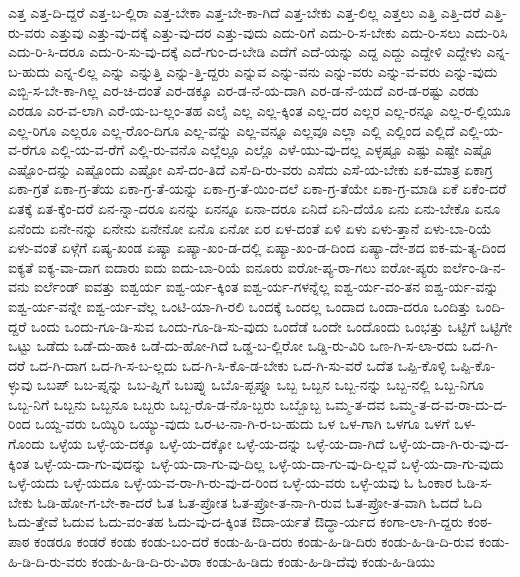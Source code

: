 {ಎತ್ತ
ಎತ್ತ-ದಿ-ದ್ದರೆ
ಎತ್ತ-ಬ-ಲ್ಲಿರಾ
ಎತ್ತ-ಬೇಕಾ
ಎತ್ತ-ಬೇ-ಕಾ-ಗಿದೆ
ಎತ್ತ-ಬೇಕು
ಎತ್ತ-ಲಿಲ್ಲ
ಎತ್ತಲು
ಎತ್ತಿ
ಎತ್ತಿ-ದರೆ
ಎತ್ತಿ-ರು-ವರು
ಎತ್ತುವು
ಎತ್ತು-ವು-ದಕ್ಕೆ
ಎತ್ತು-ವು-ದರ
ಎತ್ತು-ವುದು
ಎದು-ರಿಗೆ
ಎದು-ರಿ-ಸ-ಬೇಕು
ಎದು-ರಿ-ಸಲು
ಎದು-ರಿಸಿ
ಎದು-ರಿ-ಸಿ-ದರೂ
ಎದು-ರಿ-ಸು-ವು-ದಕ್ಕೆ
ಎದೆ-ಗುಂ-ದ-ಬೇಡಿ
ಎದೆಗೆ
ಎದೆ-ಯನ್ನು
ಎದ್ದ
ಎದ್ದು
ಎದ್ದೇಳಿ
ಎದ್ದೇಳು
ಎನ್ನ-ಬ-ಹುದು
ಎನ್ನ-ಲಿಲ್ಲ
ಎನ್ನು
ಎನ್ನುತ್ತಿ
ಎನ್ನು-ತ್ತಿ-ದ್ದರು
ಎನ್ನುವ
ಎನ್ನು-ವನು
ಎನ್ನು-ವರು
ಎನ್ನು-ವ-ವರು
ಎನ್ನು-ವುದು
ಎಬ್ಬಿ-ಸ-ಬೇ-ಕಾ-ಗಿಲ್ಲ
ಎರ-ಚಿ-ದಂತೆ
ಎರ-ಡಕ್ಕೂ
ಎರ-ಡ-ನೆ-ಯ-ದಾಗಿ
ಎರ-ಡ-ನೆ-ಯದೆ
ಎರ-ಡ-ರಷ್ಟು
ಎರಡು
ಎರಡೂ
ಎರ-ವ-ಲಾಗಿ
ಎರೆ-ಯ-ಬ-ಲ್ಲಂ-ತಹ
ಎಲೈ
ಎಲ್ಲ
ಎಲ್ಲ-ಕ್ಕಿಂತ
ಎಲ್ಲ-ದರ
ಎಲ್ಲರ
ಎಲ್ಲ-ರನ್ನೂ
ಎಲ್ಲ-ರ-ಲ್ಲಿಯೂ
ಎಲ್ಲ-ರಿಗೂ
ಎಲ್ಲರೂ
ಎಲ್ಲ-ರೊಂ-ದಿಗೂ
ಎಲ್ಲ-ವನ್ನು
ಎಲ್ಲ-ವನ್ನೂ
ಎಲ್ಲವೂ
ಎಲ್ಲಾ
ಎಲ್ಲಿ
ಎಲ್ಲಿಂದ
ಎಲ್ಲಿದೆ
ಎಲ್ಲಿ-ಯ-ವ-ರೆಗೂ
ಎಲ್ಲಿ-ಯ-ವ-ರೆಗೆ
ಎಲ್ಲಿ-ರು-ವನೊ
ಎಲ್ಲೆಲ್ಲೂ
ಎಲ್ಲೊ
ಎಳೆ-ಯು-ವು-ದಲ್ಲ
ಎಳ್ಳಷ್ಟೂ
ಎಷ್ಟು
ಎಷ್ಟೇ
ಎಷ್ಟೊ
ಎಷ್ಟೊಂ-ದನ್ನು
ಎಷ್ಟೊಂದು
ಎಷ್ಟೋ
ಎಸೆ-ದಂ-ತಿದೆ
ಎಸೆ-ದಿ-ರು-ವರು
ಎಸೆದು
ಎಸೆ-ಯ-ಬೇಕು
ಏಕ-ಮಾತ್ರ
ಏಕಾಗ್ರ
ಏಕಾ-ಗ್ರತೆ
ಏಕಾ-ಗ್ರ-ತೆಯ
ಏಕಾ-ಗ್ರ-ತೆ-ಯನ್ನು
ಏಕಾ-ಗ್ರ-ತೆ-ಯಿಂ-ದಲೆ
ಏಕಾ-ಗ್ರ-ತೆಯೇ
ಏಕಾ-ಗ್ರ-ಮಾಡಿ
ಏಕೆ
ಏಕೆಂ-ದರೆ
ಏತಕ್ಕೆ
ಏತ-ಕ್ಕೆಂ-ದರೆ
ಏನ-ನ್ನಾ-ದರೂ
ಏನನ್ನು
ಏನನ್ನೂ
ಏನಾ-ದರೂ
ಏನಿದೆ
ಏನಿ-ದೆಯೊ
ಏನು
ಏನು-ಬೇಕೊ
ಏನೂ
ಏನೆಂದು
ಏನೇ-ನನ್ನು
ಏನೇನು
ಏನೇನೋ
ಏನೊ
ಏನೋ
ಏರ
ಏಳ-ದಂತೆ
ಏಳಿ
ಏಳು
ಏಳು-ತ್ತಾನೆ
ಏಳು-ಬಾ-ರಿಯೆ
ಏಳು-ವಂತೆ
ಏಳ್ಗೆಗೆ
ಏಷ್ಯ-ಖಂಡ
ಏಷ್ಯಾ
ಏಷ್ಯಾ-ಖಂ-ಡ-ದಲ್ಲಿ
ಏಷ್ಯಾ-ಖಂ-ಡ-ದಿಂದ
ಏಷ್ಯಾ-ದೇ-ಶದ
ಐಕ-ಮ-ತ್ಯ-ದಿಂದ
ಐಕ್ಯತೆ
ಐಕ್ಯ-ವಾ-ದಾಗ
ಐದಾರು
ಐದು
ಐದು-ಬಾ-ರಿಯೆ
ಐನೂರು
ಐರೋ-ಪ್ಯ-ರಾ-ಗಲು
ಐರೋ-ಪ್ಯರು
ಐರ್ಲೆಂ-ಡಿ-ನ-ವನು
ಐರ್ಲೆಂಡ್
ಐವತ್ತು
ಐಶ್ವರ್ಯ
ಐಶ್ವ-ರ್ಯ-ಕ್ಕಿಂತ
ಐಶ್ವ-ರ್ಯ-ಗಳನ್ನೆಲ್ಲ
ಐಶ್ವ-ರ್ಯ-ವಂ-ತನ
ಐಶ್ವ-ರ್ಯ-ವನ್ನು
ಐಶ್ವ-ರ್ಯ-ವನ್ನೇ
ಐಶ್ವ-ರ್ಯ-ವೆಲ್ಲ
ಒಂಟಿ-ಯಾ-ಗಿ-ರಲಿ
ಒಂದಕ್ಕೆ
ಒಂದಲ್ಲ
ಒಂದಾದ
ಒಂದಾ-ದರೂ
ಒಂದಿತ್ತು
ಒಂದಿ-ದ್ದರೆ
ಒಂದು
ಒಂದು-ಗೂ-ಡಿ-ಸುವ
ಒಂದು-ಗೂ-ಡಿ-ಸು-ವುದು
ಒಂದೆಡೆ
ಒಂದೇ
ಒಂದೊಂದು
ಒಂಭತ್ತು
ಒಟ್ಟಿಗೆ
ಒಟ್ಟಿಗೇ
ಒಟ್ಟು
ಒಡೆದು
ಒಡೆ-ದು-ಹಾಕಿ
ಒಡೆ-ದು-ಹೋ-ಗಿದೆ
ಒಡ್ಡ-ಬ-ಲ್ಲಿರೋ
ಒಡ್ಡಿ-ರು-ವಿರಿ
ಒಣ-ಗಿ-ಸ-ಲಾ-ರದು
ಒದ-ಗಿ-ದರೆ
ಒದ-ಗಿ-ದಾಗ
ಒದ-ಗಿ-ಸ-ಬ-ಲ್ಲದು
ಒದ-ಗಿ-ಸಿ-ಕೊ-ಡ-ಬೇಕು
ಒದ-ಗಿ-ಸು-ವರೆ
ಒದೆತ
ಒಪ್ಪಿ-ಕೊಳ್ಳಿ
ಒಪ್ಪಿ-ಕೊ-ಳ್ಳುವು
ಒಬಪ್
ಒಬ-ಪ್ನನ್ನು
ಒಬ-ಪ್ನಿಗೆ
ಒಬಪ್ನು
ಒಬೊ-ಪ್ಬಪ್ನೂ
ಒಬ್ಬ
ಒಬ್ಬನ
ಒಬ್ಬ-ನನ್ನು
ಒಬ್ಬ-ನಲ್ಲಿ
ಒಬ್ಬ-ನಿಗೂ
ಒಬ್ಬ-ನಿಗೆ
ಒಬ್ಬನು
ಒಬ್ಬನೂ
ಒಬ್ಬರು
ಒಬ್ಬ-ರೊ-ಡ-ನೊ-ಬ್ಬರು
ಒಬ್ಬೊಬ್ಬ
ಒಮ್ಮ-ತ-ದವ
ಒಮ್ಮ-ತ-ದ-ವ-ರಾ-ದು-ದ-ರಿಂದ
ಒಯ್ದ-ವರು
ಒಯ್ಯಿರಿ
ಒಯ್ಯು-ವುದು
ಒರ-ಟ-ನಾ-ಗಿ-ರ-ಬ-ಹುದು
ಒಳ
ಒಳ-ಗಾಗಿ
ಒಳಗೂ
ಒಳಗೆ
ಒಳ-ಗೊಂದು
ಒಳ್ಳೆಯ
ಒಳ್ಳೆ-ಯ-ದಕ್ಕೂ
ಒಳ್ಳೆ-ಯ-ದಕ್ಕೋ
ಒಳ್ಳೆ-ಯ-ದನ್ನು
ಒಳ್ಳೆ-ಯ-ದಾ-ಗಿದೆ
ಒಳ್ಳೆ-ಯ-ದಾ-ಗಿ-ರು-ವು-ದ-ಕ್ಕಿಂತ
ಒಳ್ಳೆ-ಯ-ದಾ-ಗು-ವುದನ್ನು
ಒಳ್ಳೆ-ಯ-ದಾ-ಗು-ವು-ದಿಲ್ಲ
ಒಳ್ಳೆ-ಯ-ದಾ-ಗು-ವು-ದಿ-ಲ್ಲವೆ
ಒಳ್ಳೆ-ಯ-ದಾ-ಗು-ವುದು
ಒಳ್ಳೆ-ಯದು
ಒಳ್ಳೆ-ಯದೂ
ಒಳ್ಳೆ-ಯ-ವ-ರಾ-ಗಿ-ರು-ವು-ದ-ರಿಂದ
ಒಳ್ಳೆ-ಯ-ವರು
ಒಳ್ಳೆ-ಯವು
ಓ
ಓಂಕಾರ
ಓಡಿ-ಸ-ಬೇಕು
ಓಡಿ-ಹೋ-ಗ-ಬೇ-ಕಾ-ದರೆ
ಓತ
ಓತ-ಪ್ರೋತ
ಓತ-ಪ್ರೋ-ತ-ನಾ-ಗಿ-ರುವ
ಓತ-ಪ್ರೋ-ತ-ವಾಗಿ
ಓದದೆ
ಓದಿ
ಓದು-ತ್ತೇವೆ
ಓದುವ
ಓದು-ವಂ-ತಹ
ಓದು-ವು-ದ-ಕ್ಕಿಂತ
ಔದಾ-ರ್ಯತೆ
ಔದ್ಧಾ-ರ್ಯದ
ಕಂಗಾ-ಲಾ-ಗಿ-ದ್ದರು
ಕಂಠ-ಪಾಠ
ಕಂಡರೂ
ಕಂಡರೆ
ಕಂಡು
ಕಂಡು-ಬಂ-ದರೆ
ಕಂಡು-ಹಿ-ಡಿ-ದರು
ಕಂಡು-ಹಿ-ಡಿ-ದಿರು
ಕಂಡು-ಹಿ-ಡಿ-ದಿ-ರುವ
ಕಂಡು-ಹಿ-ಡಿ-ದಿ-ರು-ವರು
ಕಂಡು-ಹಿ-ಡಿ-ದಿ-ರು-ವಿರಾ
ಕಂಡು-ಹಿ-ಡಿದು
ಕಂಡು-ಹಿ-ಡಿ-ದೆವು
ಕಂಡು-ಹಿ-ಡಿಯು
}
